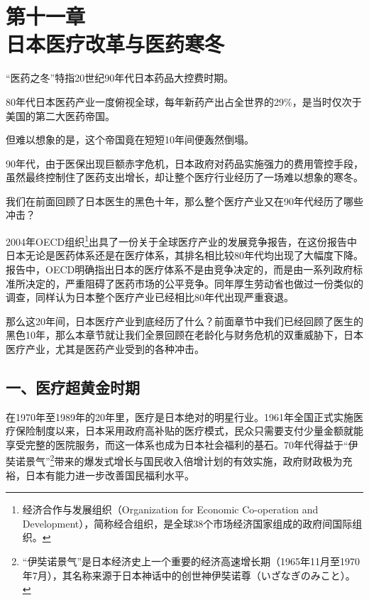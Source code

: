 

\section[第十一章\q 日本医疗改革与医药寒冬]{第十一章\\ 日本医疗改革与医药寒冬}


{\fangsong “医药之冬”特指20世纪90年代日本药品大控费时期。\par}

{\fangsong 80年代日本医药产业一度俯视全球，每年新药产出占全世界的29\%，是当时仅次于美国的第二大医药帝国。\par}

{\fangsong 但难以想象的是，这个帝国竟在短短10年间便轰然倒塌。\par}

{\fangsong 90年代，由于医保出现巨额赤字危机，日本政府对药品实施强力的费用管控手段，虽然最终控制住了医药支出增长，却让整个医疗行业经历了一场难以想象的寒冬。\par}

{\fangsong 我们在前面回顾了日本医生的黑色十年，那么整个医疗产业又在90年代经历了哪些冲击？\par}

2004年OECD组织\footnote{经济合作与发展组织（Organization for Economic Co-operation and Development），简称经合组织，是全球38个市场经济国家组成的政府间国际组织。}出具了一份关于全球医疗产业的发展竞争报告，在这份报告中日本无论是医药体系还是在医疗体系，其排名相比较80年代均出现了大幅度下降。报告中，OECD明确指出日本的医疗体系不是由竞争决定的，而是由一系列政府标准所决定的，严重阻碍了医药市场的公平竞争。同年厚生劳动省也做过一份类似的调查，同样认为日本整个医疗产业已经相比80年代出现严重衰退。

那么这20年间，日本医疗产业到底经历了什么？前面章节中我们已经回顾了医生的黑色10年，那么本章节就让我们全景回顾在老龄化与财务危机的双重威胁下，日本医疗产业，尤其是医药产业受到的各种冲击。

\subsection{一、医疗超黄金时期}

在1970年至1989年的20年里，医疗是日本绝对的明星行业。1961年全国正式实施医疗保险制度以来，日本采用政府高补贴的医疗模式，民众只需要支付少量金额就能享受完整的医院服务，而这一体系也成为日本社会福利的基石。70年代得益于“伊奘诺景气”\footnote{“伊奘诺景气”是日本经济史上一个重要的经济高速增长期（1965年11月至1970年7月），其名称来源于日本神话中的创世神伊奘诺尊（いざなぎのみこと）。}带来的爆发式增长与国民收入倍增计划的有效实施，政府财政极为充裕，日本有能力进一步改善国民福利水平。

